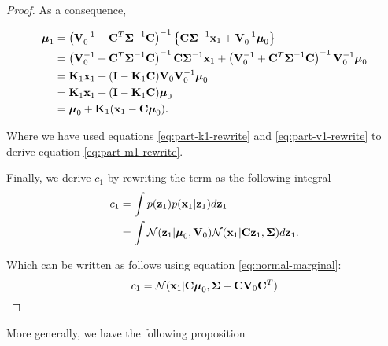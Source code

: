 \documentclass[11pt]{article}
\numberwithin{equation}{section}
\newcommand{\x}{{\bf x}}
\newcommand{\z}{{\bf z}}
\newcommand{\N}{\mathcal{N}}
\begin{document}
\begin{proof}
	As a consequence,

	\begin{align}
		\boldsymbol{\mu}_1 &= \left({\bf V}_0^{-1} + {\bf C}^T\boldsymbol{\Sigma}^{-1} {\bf C}\right)^{-1} \left\{{\bf C}\boldsymbol\Sigma^{-1}\x_1 + {\bf V}_0^{-1}\boldsymbol\mu_0\right\}\\
		&= \left({\bf V}_0^{-1} + {\bf C}^T\boldsymbol{\Sigma}^{-1} {\bf C}\right)^{-1} {\bf C}\boldsymbol\Sigma^{-1}\x_1 + \left({\bf V}_0^{-1} + {\bf C}^T\boldsymbol{\Sigma}^{-1} {\bf C}\right)^{-1} {\bf V}_0^{-1}\boldsymbol\mu_0\\
		&= {\bf K}_1\x_1 + ({\bf I} - {\bf K}_1{\bf C}){\bf V}_0 {\bf V}_0^{-1}\boldsymbol\mu_0 \label{eq:part-m1-rewrite}\\
		&= {\bf K}_1\x_1 + ({\bf I} - {\bf K}_1{\bf C})\boldsymbol\mu_0 \\
		&= \boldsymbol{\mu}_0 + {\bf K}_1(\x_1 -{\bf C}\boldsymbol\mu_0).
	\end{align}
	
	Where we have used equations \eqref{eq:part-k1-rewrite} and \eqref{eq:part-v1-rewrite} to derive equation \eqref{eq:part-m1-rewrite}.
	
	Finally, we derive $c_1$ by rewriting the term as the following integral
	\begin{align}
		c_1 &= \int p(\z_1) p (\x_1 \vert \z_1) d\z_1\\
			&= \int \N(\z_1\vert \boldsymbol\mu_0, {\bf V}_0) \N(\x_1 \vert {\bf C}\z_1, \boldsymbol\Sigma) d\z_1.
	\end{align}
	
	Which can be written as follows using equation \eqref{eq:normal-marginal}:
	\begin{equation}
		c_1 = \N(\x_1 \vert {\bf C}\boldsymbol\mu_0, \boldsymbol\Sigma + {\bf C}{\bf V}_0 {\bf C}^T)
	\end{equation}
\end{proof}


More generally, we have the following proposition
\end{document}
